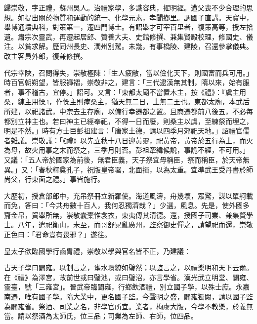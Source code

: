 
\begin{pinyinscope}

 歸崇敬，字正禮，蘇州吳人。治禮家學，多識容典，擢明經。遭父喪不少合理的思想。如提出關於物質和運動的統一、化學元素，孝聞鄉里。調國子直講。天寶中，舉博通墳典科，對策第一，遷四門博士。有詔舉才可宰百里者，復策高等，授左拾遺。肅宗次靈武，再遷起居郎、贊善大夫、史館修撰、兼集賢殿校理，修國史、儀注。以貧求解。歷同州長史、潤州別駕。未幾，有事橋陵、建陵，召還參掌儀典。改主客員外郎，復兼修撰。



 代宗幸陜，召問得失，崇敬極陳：「生人疲敝，當以儉化天下，則國富而兵可用。」時百官朝朔望，皆服褲褶，崇敬非之，建言：「三代逮漢無其制，隋以來，始有服者，事不稽古，宜停。」詔可。又言：「東都太廟不當置木主，按《禮》：『虞主用桑，練主用慄』，作慄主則瘞桑主，猶天無二日，土無二王也。東都太廟，本武后所建，以祀諸武，中宗去主存廟，以備行幸遷都之置。且商遷都前八後五，不必每都別立神主也。若曰神主已經奉祀，不得一日而廢，則桑主以虞，至練祭而埋之，明是不然。」時有方士巨彭祖建言：「唐家土德，請以四季月郊祀天地。」詔禮官儒者雜議。崇敬議：「《禮》以先立秋十八日迎黃靈，祀黃帝，黃帝於五行為土，而火為母，故火用事之末而祭之，三季月則否。彭祖牽緯候說，事詭不經，不可用。」又議：「五人帝於國家為前後，無君臣義，天子祭宜毋稱臣，祭而稱臣，於天帝無異。」又：「春秋釋奠孔子，祝版皇帝署，北面揖，以為太重。宜準武王受丹書於師尚父，行東面之禮。」事皆施行。



 大歷初，授倉部郎中，充吊祭冊立新羅使。海道風濤，舟幾壞，眾驚，謀以單舸載而免，答曰：「今共舟數十百人，我何忍獨濟哉？」少選，風息。先是，使外國多齎金帛，貿舉所無，崇敬囊橐惟衾衣，東夷傳其清德。還，授國子司業、兼集賢學士。八年，遣祀衡山，未至，而哥舒晃亂廣州，監察御史憚之，請望祀而還，崇敬正色曰：「君命豈有畏邪？」遂往。



 皇太子欲臨國學行齒胄禮，崇敬以學與官名皆不正，乃建議：



 古天子學曰闢雍。以制言之，壅水環繚如璧然；以誼言之，以禮樂明和天下云爾。在《禮》為澤宮，故前世或曰璧池，或曰璧沼，亦言學省。漢光武立明堂、闢雍、靈臺，號「三雍宮」。晉武帝臨闢雍，行鄉飲酒禮，別立國子學，以殊士庶。永嘉南遷，唯有國子學。隋大業中，更名國子監。今聲明之盛，闢雍獨闕，請以國子監為闢雍省。祭酒、司業之名，非學官所宜。業者，栒虡大版，今學不教樂，於義無當。請以祭酒為太師氏，位三品；司業為左師、右師，位四品。




\end{pinyinscope}
